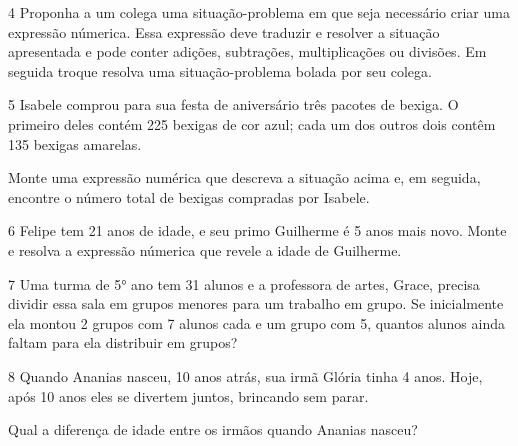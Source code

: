 {


\num{4} Proponha a um colega uma situação-problema em que seja necessário
criar uma expressão númerica. Essa expressão deve traduzir e resolver a
situação apresentada e pode conter adições, subtrações, multiplicações 
ou divisões. Em seguida troque resolva uma situação-problema bolada por 
seu colega.



\num{5} Isabele comprou para sua festa de aniversário três pacotes de
bexiga. O primeiro deles contém 225 bexigas de cor azul; cada um dos
outros dois contêm 135 bexigas amarelas.

Monte uma expressão numérica que descreva a situação acima 
e, em seguida, encontre o número total de bexigas compradas por Isabele.



\num{6} Felipe tem 21 anos de idade, e seu primo Guilherme é 5 anos mais
novo. Monte e resolva a expressão númerica que revele a
idade de Guilherme.



\num{7} Uma turma de 5° ano tem 31 alunos e a professora de artes, Grace,
precisa dividir essa sala em grupos menores para um trabalho em grupo.
Se inicialmente ela montou 2 grupos com 7 alunos cada e um grupo com 5,
quantos alunos ainda faltam para ela distribuir em grupos?



\num{8} Quando Ananias nasceu, 10 anos atrás, sua irmã Glória tinha 4 
anos. Hoje, após 10 anos eles se divertem juntos, brincando sem parar.

\begin{escolha}
\item
  Qual a diferença de idade entre os irmãos quando Ananias nasceu?



\end{escolha}}
